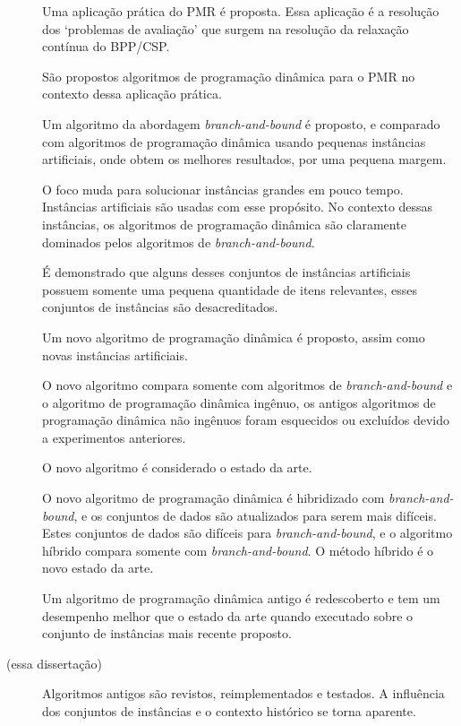\begin{description}
\item[\cite{gg-61}] Uma aplicação prática do PMR é proposta. Essa aplicação é a resolução dos `problemas de avaliação' que surgem na resolução da relaxação contínua do BPP/CSP.
\item[\cite{gg-66}] São propostos algoritmos de programação dinâmica para o PMR no contexto dessa aplicação prática.
\item[\cite{mtu1}] Um algoritmo da abordagem \emph{branch-and-bound} é proposto, e comparado com algoritmos de programação dinâmica usando pequenas instâncias artificiais, onde obtem os melhores resultados, por uma pequena margem. 
\item[\cite{mtu2}] O foco muda para solucionar instâncias grandes em pouco tempo. Instâncias artificiais são usadas com esse propósito. No contexto dessas instâncias, os algoritmos de programação dinâmica são claramente dominados pelos algoritmos de \emph{branch-and-bound}.
\item[\cite{zhu_dominated}] É demonstrado que alguns desses conjuntos de instâncias artificiais possuem somente uma pequena quantidade de itens relevantes, esses conjuntos de instâncias são desacreditados.
\item[\cite{ukp_new_results}] Um novo algoritmo de programação dinâmica é proposto, assim como novas instâncias artificiais.
\item[\cite{eduk}] O novo algoritmo compara somente com algoritmos de \emph{branch-and-bound} e o algoritmo de programação dinâmica ingênuo, os antigos algoritmos de programação dinâmica não ingênuos foram esquecidos ou excluídos devido a experimentos anteriores.
\item[\cite{book_ukp_2004}] O novo algoritmo é considerado o estado da arte.
\item[\cite{pya}] O novo algoritmo de programação dinâmica é hibridizado com \emph{branch-and-bound}, e os conjuntos de dados são atualizados para serem mais difíceis. Estes conjuntos de dados são difíceis para \emph{branch-and-bound}, e o algoritmo híbrido compara somente com \emph{branch-and-bound}. O método híbrido é o novo estado da arte.
\item[\cite{sea2016}] Um algoritmo de programação dinâmica antigo é redescoberto e tem um desempenho melhor que o estado da arte quando executado sobre o conjunto de instâncias mais recente proposto.
\item[(essa dissertação)] Algoritmos antigos são revistos, reimplementados e testados. A influência dos conjuntos de instâncias e o contexto histórico se torna aparente.
\end{description}

